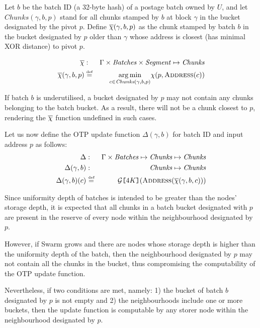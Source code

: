 Let $b$ be the batch ID (a 32-byte hash) of a postage batch owned by $U$, and 
let $\mathit{Chunks}(\gamma,b,p)$ stand for all chunks stamped by $b$ at block $\gamma$ in the bucket designated by the pivot $p$. Define  $\overline{\Huge\chi}(\gamma,b,p)$ as the chunk stamped by batch $b$ in the bucket designated by $p$ older than $\gamma$  whose address is closest (has minimal XOR distance) to pivot $p$.

\begin{eqnarray}
\overline{\Huge\chi}&:& \Gamma\times\mathit{Batches}\times \mathit{Segment} \mapsto \mathit{Chunks}\\
\overline{\Huge\chi}(\gamma,b,p)&\defeq &\underset{c\in \mathit{Chunks}(\gamma,b,p)}{\operatorname{arg\,min}}{\Large\chi}(p,\textsc{Address}(c))
\end{eqnarray}

If batch $b$ is underutilised, a bucket designated by $p$
may not contain any chunks belonging to the batch bucket.
As a result, there will not be a chunk closest to $p$, rendering the $\overline{\Huge\chi}$ function undefined in such cases.

Let us now define the OTP update function $\Delta(\gamma,b)$
for batch ID and input address $p$ as follows: 
%
\begin{eqnarray}
{\Delta}&:&\Gamma\times\mathit{Batches}\mapsto\mathit{Chunks}\mapsto\mathit{Chunks}\\\
{\Delta}(\gamma, b)&:&\mathit{Chunks}\mapsto\mathit{Chunks}\\
\Delta(\gamma,b)(c)&\defeq&\mathcal{G}\idx{4K}(\textsc{Address}(\overline{\Huge\chi}(\gamma,b,c)))
\end{eqnarray}


Since uniformity depth of batches is intended to be greater than the nodes' storage depth, it is expected that all chunks in a batch bucket designated with $p$ are present in the reserve of every node within the neighbourhood designated by $p$. 

However, if Swarm grows and there are nodes whose storage depth is higher than the uniformity depth of the batch, then the neighbourhood designated by $p$ may not contain all the
chunks in the bucket, thus compromising the computability of the OTP update function.

Nevertheless, if two conditions are met, namely: 1) the bucket of batch $b$ designated by $p$ is not empty and 2) the neighbourhoods include one or more buckets, then the update function is computable by any storer node within the neighbourhood designated by $p$.

